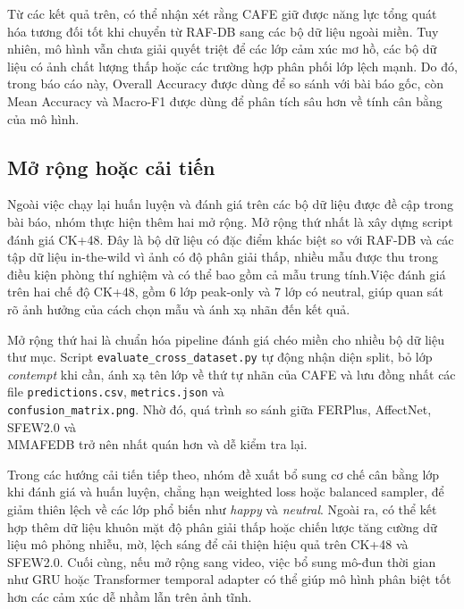 Từ các kết quả trên, có thể nhận xét rằng CAFE giữ được năng lực tổng quát hóa tương đối tốt khi chuyển từ RAF-DB sang các bộ dữ liệu ngoài miền. Tuy nhiên, mô hình vẫn chưa giải quyết triệt để các lớp cảm xúc mơ hồ, các bộ dữ liệu có ảnh chất lượng thấp hoặc các trường hợp phân phối lớp lệch mạnh. Do đó, trong báo cáo này, Overall Accuracy được dùng để so sánh với bài báo gốc, còn Mean Accuracy và Macro-F1 được dùng để phân tích sâu hơn về tính cân bằng của mô hình.
\subsection{Mở rộng hoặc cải tiến}


Ngoài việc chạy lại huấn luyện và đánh giá trên các bộ dữ liệu được đề cập trong bài báo, nhóm thực hiện thêm hai mở rộng. Mở rộng thứ nhất là xây dựng script đánh giá CK+48. Đây là bộ dữ liệu có đặc điểm khác biệt so với RAF-DB và các tập dữ liệu in-the-wild vì ảnh có độ phân giải thấp, nhiều mẫu được thu trong điều kiện phòng thí nghiệm và có thể bao gồm cả mẫu trung tính.Việc đánh giá trên hai chế độ CK+48, gồm 6 lớp peak-only và 7 lớp có neutral, giúp quan sát rõ ảnh hưởng của cách chọn mẫu và ánh xạ nhãn đến kết quả.

Mở rộng thứ hai là chuẩn hóa pipeline đánh giá chéo miền cho nhiều bộ dữ liệu thư mục. Script \texttt{evaluate\_cross\_dataset.py} tự động nhận diện split, bỏ lớp \textit{contempt} khi cần, ánh xạ tên lớp về thứ tự nhãn của CAFE và lưu đồng nhất các file \texttt{predictions.csv}, \texttt{metrics.json} và \\ \texttt{confusion\_matrix.png}. Nhờ đó, quá trình so sánh giữa FERPlus, AffectNet, SFEW2.0 và \\ MMAFEDB trở nên nhất quán hơn và dễ kiểm tra lại.

Trong các hướng cải tiến tiếp theo, nhóm đề xuất bổ sung cơ chế cân bằng lớp khi đánh giá và huấn luyện, chẳng hạn weighted loss hoặc balanced sampler, để giảm thiên lệch về các lớp phổ biến như \textit{happy} và \textit{neutral}. Ngoài ra, có thể kết hợp thêm dữ liệu khuôn mặt độ phân giải thấp hoặc chiến lược tăng cường dữ liệu mô phỏng nhiễu, mờ, lệch sáng để cải thiện hiệu quả trên CK+48 và SFEW2.0. Cuối cùng, nếu mở rộng sang video, việc bổ sung mô-đun thời gian như GRU hoặc Transformer temporal adapter có thể giúp mô hình phân biệt tốt hơn các cảm xúc dễ nhầm lẫn trên ảnh tĩnh.


